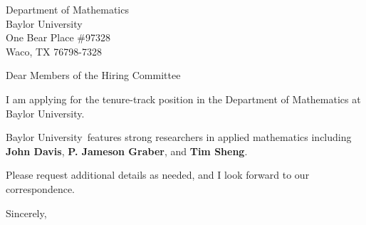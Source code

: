 




	
	
	\def\School{Baylor University}
	
	\begin{letter}
		{Department of Mathematics\\
			Baylor University\\
			One Bear Place \#97328\\
			Waco, TX 76798-7328
		}
		
		\opening{Dear Members of the Hiring Committee}
		
		
		I am applying for the tenure-track position in the Department of Mathematics at \School. 
		
		\School~features strong researchers in applied mathematics including \textbf{John Davis}, \textbf{P. Jameson Graber}, and \textbf{Tim Sheng}. 
		
		
		
		
		
		Please request additional details as needed, and I look forward to our correspondence.
		
		\closing{Sincerely,}
	\end{letter}
